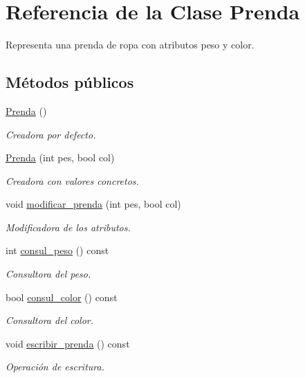 \hypertarget{class_prenda}{\section{Referencia de la Clase Prenda}
\label{class_prenda}
}


Representa una prenda de ropa con atributos peso y color.  


\subsection*{Métodos públicos}
\begin{DoxyCompactItemize}
\item 
\hyperlink{class_prenda_adfd86b131c7f40c58b0cb4200eb55129}{Prenda} ()
\begin{DoxyCompactList}\small\item\em Creadora por defecto. \end{DoxyCompactList}\item 
\hyperlink{class_prenda_af15ff723083040b89bc495b4ec4b914e}{Prenda} (int pes, bool col)
\begin{DoxyCompactList}\small\item\em Creadora con valores concretos. \end{DoxyCompactList}\item 
void \hyperlink{class_prenda_a598bccf93cb8aa217a8533c0307c686f}{modificar\-\_\-prenda} (int pes, bool col)
\begin{DoxyCompactList}\small\item\em Modificadora de los atributos. \end{DoxyCompactList}\item 
int \hyperlink{class_prenda_ae886133326d46cc18dd9070d317a3ccb}{consul\-\_\-peso} () const 
\begin{DoxyCompactList}\small\item\em Consultora del peso. \end{DoxyCompactList}\item 
bool \hyperlink{class_prenda_a149632ba71127621c52917ef2e936c2e}{consul\-\_\-color} () const 
\begin{DoxyCompactList}\small\item\em Consultora del color. \end{DoxyCompactList}\item 
void \hyperlink{class_prenda_ab3bc4680187543b363088760533c7a07}{escribir\-\_\-prenda} () const 
\begin{DoxyCompactList}\small\item\em Operación de escritura. \end{DoxyCompactList}\end{DoxyCompactItemize}



